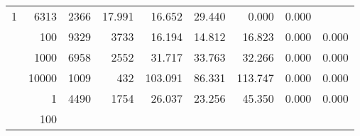 \begin{table}
\begin{tabular}{rrrrrrrrr}
					
					 
					\multirow{ 1 }{*}{ 1 } &
					
						
							    
							     6313  & 2366  
	                           & 17.991 & 16.652 & 29.440
	                           & 0.000 & 0.000  \\
	                
	            
					 &  
					 
					\multirow{ 1 }{*}{ 100 } &
					
						
							    
							     9329  & 3733  
	                           & 16.194 & 14.812 & 16.823
	                           & 0.000 & 0.000  \\
	                
	            
					 &  
					 
					\multirow{ 1 }{*}{ 1000 } &
					
						
							    
							     6958  & 2552  
	                           & 31.717 & 33.763 & 32.266
	                           & 0.000 & 0.000  \\
	                
	            
					 &  
					 
					\multirow{ 1 }{*}{ 10000 } &
					
						
							    
							     1009  & 432  
	                           & 103.091 & 86.331 & 113.747
	                           & 0.000 & 0.000  \\
	                
	            
	        
				\noalign{\smallskip}\hline
				\multirow{ 4 }{*}{ 2000000 } &
				
					
					 
					\multirow{ 1 }{*}{ 1 } &
					
						
							    
							     4490  & 1754  
	                           & 26.037 & 23.256 & 45.350
	                           & 0.000 & 0.000  \\
	                
	            
					 &  
					 
					\multirow{ 1 }{*}{ 100 } &
					
						
							    

\end{tabular}
\end{table}
